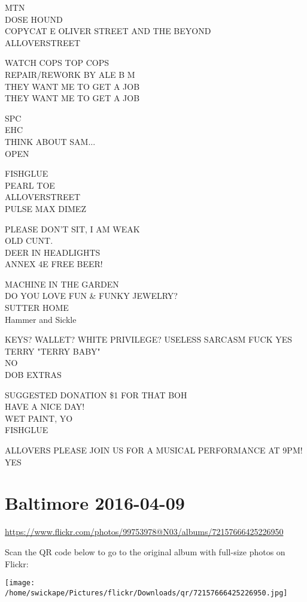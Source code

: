 \documentclass[10pt,letterpaper]{article}
\begin{document}
MTN\\
DOSE HOUND\\
COPYCAT E OLIVER STREET AND THE BEYOND\\
ALLOVERSTREET

WATCH COPS TOP COPS\\
REPAIR/REWORK BY ALE B M\\
THEY WANT ME TO GET A JOB\\
THEY WANT ME TO GET A JOB

SPC\\
EHC\\
THINK ABOUT SAM...\\
OPEN

FISHGLUE\\
PEARL TOE\\
ALLOVERSTREET\\
PULSE MAX DIMEZ

PLEASE DON'T SIT, I AM WEAK\\
OLD CUNT.\\
DEER IN HEADLIGHTS\\
ANNEX 4E FREE BEER!

MACHINE IN THE GARDEN\\
DO YOU LOVE FUN \& FUNKY JEWELRY?\\
SUTTER HOME\\
Hammer and Sickle

KEYS?  WALLET?  WHITE PRIVILEGE?  USELESS SARCASM FUCK YES\\
TERRY "TERRY BABY"\\
NO\\
DOB EXTRAS

SUGGESTED DONATION \$1 FOR THAT BOH\\
HAVE A NICE DAY!\\
WET PAINT, YO\\
FISHGLUE

ALLOVERS PLEASE JOIN US FOR A MUSICAL PERFORMANCE AT 9PM!\\
YES


\section*{Baltimore 2016-04-09}

\url{https://www.flickr.com/photos/99753978@N03/albums/72157666425226950}

Scan the QR code below to go to the original album with full-size photos on Flickr:

\texttt{[image: /home/swickape/Pictures/flickr/Downloads/qr/72157666425226950.jpg]}
\end{document}
